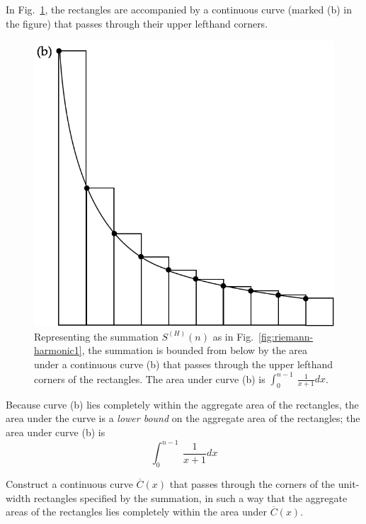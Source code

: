 \begin{enumerate}
In Fig.~\ref{fig:riemann-harmonic2}, the rectangles are accompanied by
a continuous curve (marked (b) in the figure) that passes through
their upper lefthand corners.
\begin{figure}[htb]
\centerline{
\includegraphics[scale=0.3]{FiguresMaths/RiemannSum2}
}
\caption{Representing the summation $S^{(H)}(n)$ as in
  Fig.~\ref{fig:riemann-harmonic1}, the summation is bounded from
  below by the area under a continuous curve (b) that passes through
  the upper lefthand corners of the rectangles.  The area under curve
  (b) is $\int_0^{n-1} \ \frac{1}{x+1} dx$.}
\label{fig:riemann-harmonic2}
\end{figure}
Because curve (b) lies completely within the aggregate area of the
rectangles, the area under the curve is a {\em lower bound} on the
aggregate area of the rectangles; the area under curve (b) is
\[ \int_0^{n-1}  \ \frac{1}{x+1} dx \]
  \end{enumerate}
%

\medskip

%
Construct a continuous curve $\overline{C}(x)$ that passes through the
corners of the unit-width rectangles specified by the summation, in
such a way that the aggregate areas of the rectangles lies completely
within the area under $\overline{C}(x)$.
\medskip


